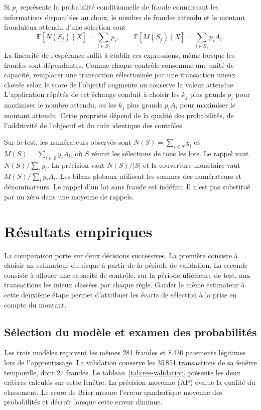\documentclass[11pt,a4paper]{article}
\begin{document}
Si $p_i$ représente la probabilité conditionnelle de fraude connaissant les informations disponibles au choix, le nombre de fraudes attendu et le montant frauduleux attendu d'une sélection sont
\begin{equation}
 \mathbb{E}[N(S_j)\mid X]=\sum_{i\in S_j}p_i,
 \qquad
 \mathbb{E}[M(S_j)\mid X]=\sum_{i\in S_j}p_i A_i .
 \label{eq:objectifs}
\end{equation}
La linéarité de l'espérance suffit à établir ces expressions, même lorsque les fraudes sont dépendantes. Comme chaque contrôle consomme une unité de capacité, remplacer une transaction sélectionnée par une transaction mieux classée selon le score de l'objectif augmente ou conserve la valeur attendue. L'application répétée de cet échange conduit à choisir les $k_j$ plus grands $p_i$ pour maximiser le nombre attendu, ou les $k_j$ plus grands $p_iA_i$ pour maximiser le montant attendu. Cette propriété dépend de la qualité des probabilités, de l'additivité de l'objectif et du coût identique des contrôles.

Sur le test, les numérateurs observés sont $N(S)=\sum_{i\in S}y_i$ et $M(S)=\sum_{i\in S}y_iA_i$, où $S$ réunit les sélections de tous les lots. Le rappel vaut $N(S)/\sum_i y_i$. La précision vaut $N(S)/|S|$ et la couverture monétaire vaut $M(S)/\sum_i y_iA_i$. Les bilans globaux utilisent les sommes des numérateurs et dénominateurs. Le rappel d'un lot sans fraude est indéfini. Il n'est pas substitué par un zéro dans une moyenne de rappels.
\clearpage
\section{Résultats empiriques}
\label{sec:resultats-empiriques}

La comparaison porte sur deux décisions successives. La première consiste à choisir un estimateur du risque à partir de la période de validation. La seconde consiste à allouer une capacité de contrôle, sur la période ultérieure de test, aux transactions les mieux classées par chaque règle. Garder le même estimateur à cette deuxième étape permet d'attribuer les écarts de sélection à la prise en compte du montant.

\subsection{Sélection du modèle et examen des probabilités}

Les trois modèles reçoivent les mêmes 281 fraudes et 8\,430 paiements légitimes lors de l'apprentissage. La validation conserve les 35\,851 transactions de sa fenêtre temporelle, dont 27 fraudes. Le tableau~\ref{tab:res-validation} présente les deux critères calculés sur cette fenêtre. La précision moyenne (AP) évalue la qualité du classement. Le score de Brier mesure l'erreur quadratique moyenne des probabilités et décroît lorsque cette erreur diminue.
\end{document}

